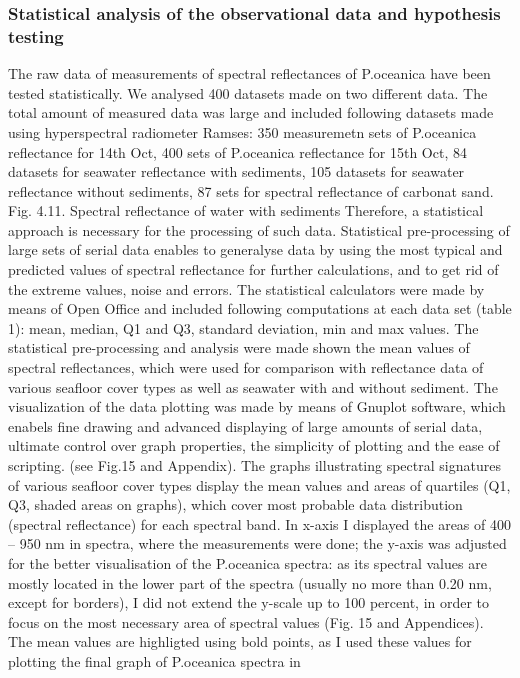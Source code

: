 \documentclass[10pt, a4paper]{article}
\begin{document}
\subsubsection{Statistical analysis of the observational data and hypothesis testing}
The raw data of measurements of spectral reflectances of P.oceanica have been tested statistically. We
analysed 400 datasets made on two different data.
The total amount of measured data was large and included following datasets made using
hyperspectral radiometer Ramses: 350 measuremetn sets of P.oceanica reflectance for 14th Oct, 400
sets of P.oceanica reflectance for 15th Oct, 84 datasets for seawater reflectance with sediments, 105
datasets for seawater reflectance without sediments, 87 sets for spectral reflectance of carbonat sand.
Fig. 4.11. Spectral reflectance of water with sediments
Therefore, a statistical approach is necessary for the processing of such data. Statistical pre-processing
of large sets of serial data enables to generalyse data by using the most typical and predicted values of
spectral reflectance for further calculations, and to get rid of the extreme values, noise and errors.
The statistical calculators were made by means of Open Office and included following computations
at each data set (table 1): mean, median, Q1 and Q3, standard deviation, min and max values. The
statistical pre-processing and analysis were made shown the mean values of spectral reflectances,
which were used for comparison with reflectance data of various seafloor cover types as well as
seawater with and without sediment.
The visualization of the data plotting was made by means of Gnuplot software, which enabels fine
drawing and advanced displaying of large amounts of serial data, ultimate control over graph properties, 
the simplicity of plotting and the ease of scripting. (see Fig.15 and Appendix).
The graphs illustrating spectral signatures of various seafloor cover types display the mean values and
areas of quartiles (Q1, Q3, shaded areas on graphs), which cover most probable data distribution
(spectral reflectance) for each spectral band. In x-axis I displayed the areas of 400 – 950 nm in
spectra, where the measurements were done; the y-axis was adjusted for the better visualisation of the
P.oceanica spectra: as its spectral values are mostly located in the lower part of the spectra (usually no
more than 0.20 nm, except for borders), I did not extend the y-scale up to 100 percent, in order to
focus on the most necessary area of spectral values (Fig. 15 and Appendices). The mean values are
highligted using bold points, as I used these values for plotting the final graph of P.oceanica spectra in
\end{document}
